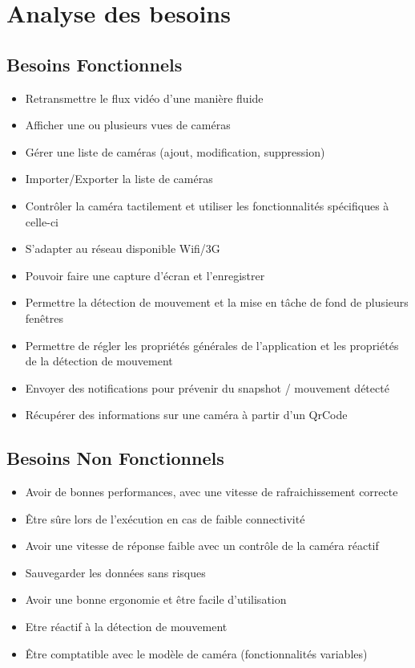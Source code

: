\chapter{Analyse des besoins}
\section{Besoins Fonctionnels}
\begin{itemize}
  \item  Retransmettre le flux vidéo d'une manière fluide
  \item Afficher une ou plusieurs vues de caméras
  \item  Gérer une liste de caméras (ajout, modification, suppression)
  \item Importer/Exporter la liste de caméras
  \item Contrôler la caméra tactilement et utiliser les fonctionnalités spécifiques à celle-ci
  \item S'adapter au réseau disponible Wifi/3G
  \item Pouvoir faire une capture d'écran et l'enregistrer
  \item Permettre la détection de mouvement et la mise en tâche de fond de plusieurs fenêtres
  \item Permettre de régler les propriétés générales de l'application et les propriétés de la détection de mouvement
  \item  Envoyer des notifications pour prévenir du snapshot / mouvement détecté 
  \item  Récupérer des informations sur une caméra à partir d'un QrCode
\end{itemize}
\section{Besoins Non Fonctionnels}
\begin{itemize}
  \item  Avoir de bonnes performances, avec une vitesse de rafraichissement correcte
  \item  Être sûre lors de l'exécution en cas de faible connectivité
  \item  Avoir une vitesse de réponse faible avec un contrôle de la caméra réactif
  \item  Sauvegarder les données sans risques
  \item Avoir une bonne ergonomie et être facile d'utilisation
  \item  Etre réactif à la détection de mouvement
  \item  Être comptatible avec le modèle de caméra (fonctionnalités variables)
\end{itemize}
\clearpage